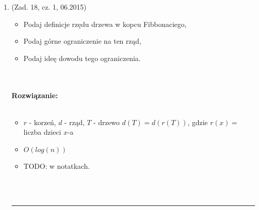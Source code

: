 \documentclass[10pt]{article}%
\newcommand{\beginsolution}{\textbf{\\~\\ \textbf{Rozwiązanie:} \\~\\}}
\newcommand{\finishsolution}{~\\~\\ \noindent\rule{11cm}{0.4pt}}
\begin{document}
\begin{enumerate}
\beginsolution
Eager: \\
\begin{itemize}
	\item \textit{findmin} - trzymamy przy kopcu wskaźnik MIN wskazujący minimalny element. Koszt $O(1)$. 
	\item \textit{meld} - przywracamy strukturę kopca natychmiast. Drzewa kopca dostępne są przez tablicę wskaźników. Każdy kopiec zawiera co najwyżej jedno drzewo każdego rzędu. Kopiec zawierający n elementów składa się z co najwyżej $log(n)$ różnych drzew dwumianowych. Koszt $O(log(n))$.
	\item \textit{deletemin} - wskaźnik MIN wskazuje na drzewo dwumianowe $B$, które zawiera najmniejszy element. Usunięcie $B$ to czas stały, otrzymujemy zbiór drzew $B_0$, $B_1$, $B_{d(B)-1}$, który tworzy nowy kopiec dwumianowy. Łączymy kopce za pomocą operacji meld. Koszt $O(log(n))$.
	\item \textit{insert} - TODO $O(1)$ zamortyzowany
\end{itemize}
Lazy : \\
\begin{itemize}
	\item \textit{findmin} - tak jak w Eager $O(1)$
	\item \textit{meld} - Drzewa kopca przechowywane są jako lista cykliczna, dwukierunkowa. Łączymy dwie listy i aktualizujemy wskaźnik MIN. Czas $O(1)$, ale nie zachowujemy struktury kopca i możemy mieć kilka drzewa tego samego rozmiaru
	\item \textit{insert} - czas $O(1)$ tworzymy nowe drzewo i dodajemy, ew. aktualizujemy wskaźnik MIN
	\item \textit {deletemin} Pojedyncza operacja \textit{deletemin} może kosztować nawet $O(n)$ (gdy kopiec składa się z drzew jednoelementowych). Czas zamortyzowany można ograniczyć przez $O(log(n))$. Analiza w notatkach.
\end{itemize}
\finishsolution

\item (Zad. 18, cz. 1, 06.2015) 
\begin{itemize}
	\item Podaj definicje rzędu drzewa w kopcu Fibbonaciego, 
	\item Podaj górne ograniczenie na ten rząd, 
	\item Podaj ideę dowodu tego ograniczenia. 
\end{itemize}

\beginsolution
\begin{itemize}
	\item $r$ - korzeń, $d$ - rząd, $T$ - drzewo 
	$d(T) = d(r(T))$, gdzie $r(x) = $ liczba dzieci $x$-a
	\item $O(log(n))$ 
	\item TODO: w notatkach.
\end{itemize} 

\finishsolution

\end{enumerate}
\end{document}
